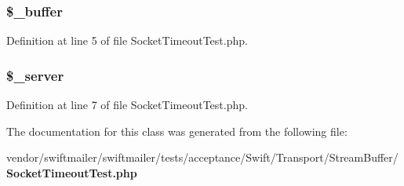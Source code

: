 \subsubsection[{\$\+\_\+buffer}]{\setlength{\rightskip}{0pt plus 5cm}\$\+\_\+buffer\hspace{0.3cm}{\ttfamily [protected]}}\label{class_swift___transport___stream_buffer___socket_timeout_test_a79d65a505a68daa9b33764798f34b0c7}


Definition at line 5 of file Socket\+Timeout\+Test.\+php.

\subsubsection[{\$\+\_\+server}]{\setlength{\rightskip}{0pt plus 5cm}\$\+\_\+server\hspace{0.3cm}{\ttfamily [protected]}}\label{class_swift___transport___stream_buffer___socket_timeout_test_a1821ed52689d0110d77eb1e440775e1e}


Definition at line 7 of file Socket\+Timeout\+Test.\+php.



The documentation for this class was generated from the following file\+:\begin{DoxyCompactItemize}
\item 
vendor/swiftmailer/swiftmailer/tests/acceptance/\+Swift/\+Transport/\+Stream\+Buffer/{\bf Socket\+Timeout\+Test.\+php}\end{DoxyCompactItemize}
